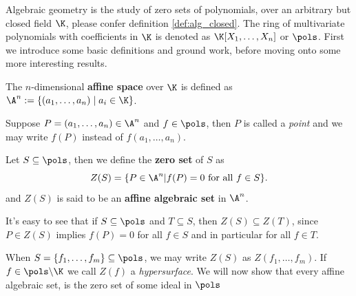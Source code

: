 Algebraic geometry is the study of zero sets of polynomials, over an arbitrary but closed field $\K$, please confer definition \ref{def:alg_closed}.
The ring of multivariate polynomials with coefficients in $\K$ is denoted as $\K[X_{1}, \ldots, X_{n}]$ or $\pols$.
First we introduce some basic definitions and ground work, before moving onto some more interesting results.
\begin{definition}
  The $n$-dimensional \textbf{affine space} over $\K$ is defined as $\A^{n} := \{(a_{1}, \ldots, a_{n}) \;\vert\; a_{i} \in \K\}$.
\end{definition}
Suppose $P = (a_{1}, \ldots, a_{n}) \in \A^{n}$ and $f \in \pols$, then $P$ is called a \textit{point} and we may write $f(P)$ instead of $f(a_{1}, \ldots, a_{n})$.
\begin{definition}\label{def:alg_set}
  Let $S \subseteq \pols$, then we define the \textbf{zero set} of $S$ as
  \begin{equation*}
    Z(S) = \{P \in \A^{n} | f(P) = 0 \text{ for all }  f \in S\}.
  \end{equation*}
  and $Z(S)$ is said to be an \textbf{affine algebraic set} in $\A^{n}$.
\end{definition}
\begin{remark}\label{rem:bigger_sets_lead_to_smaller_zero_sets}
  It's easy to see that if $S \subseteq \pols$ and $T \subseteq S$, then $Z(S) \subseteq Z(T)$, since $P \in Z(S)$ implies $f(P) = 0$ for all $f \in S$ and in particular for all $f \in T$.
\end{remark}

When $S = \{f_{1}, \ldots, f_{m}\} \subseteq \pols$, we may write $Z(S)$ as $Z(f_{1}, \ldots, f_{m})$. If $f \in \pols \backslash \K$ we call $Z(f)$ a \textit{hypersurface}. We will now show that every affine algebraic set, is the zero set of some ideal in $\pols$

